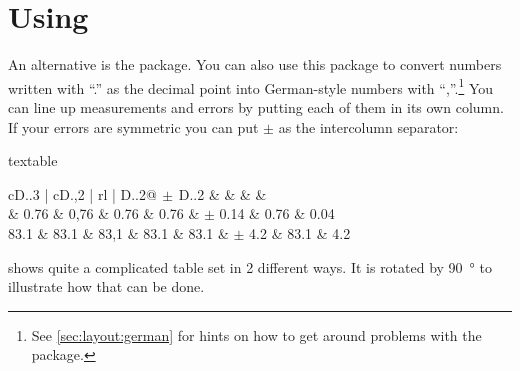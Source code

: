 \section{Using }%
\label{sec:tab:dcolumn}

An alternative is the  package. You can also use this
package to convert numbers written with \enquote{.} as the decimal point
into German-style numbers with \enquote{,}.\footnote{See
  \cref{sec:layout:german} for hints on how to get
  around problems with the  package.}
You can line up measurements and errors by putting each of them in its own column. If
your errors are symmetric you can put \(\pm\) as the intercolumn
separator:

\begin{tcblisting}{textable}
\centering
\begin{tabular}{cD{.}{.}{3} | cD{.}{,}{2} | rl |
  D{.}{.}{2}@{\(\,\pm\,\)}D{.}{.}{2}}
   &
   &
   &
   & \\
   & 0.76 & 0,76 & 0.76 & 0.76 & \(\pm\) 0.14 & 0.76 & 0.04\\
  83.1 & 83.1 & 83,1 & 83.1 & 83.1 & \(\pm\) 4.2  & 83.1 & 4.2
\end{tabular}
\end{tcblisting}

 shows quite a complicated table
set in 2 different ways. It is rotated by \SI{90}{\degree} to
illustrate how that can be done.

